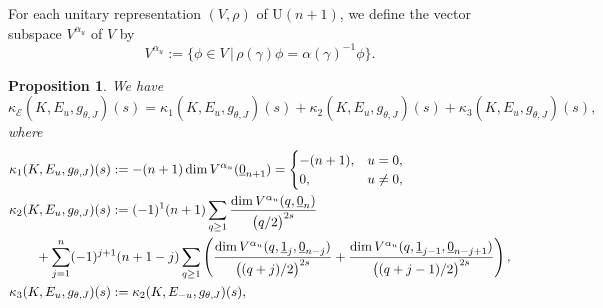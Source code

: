 \documentclass[10pt,a4paper]{amsart}
\numberwithin{equation}{section}
\newtheorem{Proposition}[Theorem]{Proposition}
 { \theoremstyle{definition}
\newtheorem{Definition}[Theorem]{Definition}
\newtheorem{Note}[Theorem]{Note}
\newtheorem{Example}[Theorem]{Example}
\newtheorem{Remark}[Theorem]{Remark} }
\newcommand{\RN}{\cE}
\newcommand{\cE}{\mathcal{E}}
\begin{document}
For each unitary representation $(V , \rho )$ of $\mathrm{U}(n+1)$, we define the vector subspace $V^{\alpha_u}$ of $V$ by
\[
V^{\alpha_u} := \big\{ \phi \in V \, \big| \, \rho ( \gamma ) \phi = \alpha ( \gamma )^{-1} \phi \big\}
.
\]

\begin{Proposition}
 We have
 \begin{equation} \label{eq:decom_of_kappa}
 \kappa_\RN (K, E_{u} , g_{\theta , J} ) (s)
 =
 \kappa_{1} (K, E_{u} , g_{\theta , J} ) (s)
 + \kappa_{2} (K, E_{u} , g_{\theta , J} ) (s)
 + \kappa_{3} (K, E_{u} , g_{\theta , J} ) (s),
 \end{equation}
 where
 \begin{align}
 & \kappa_{1} (K, E_{u} , g_{\theta , J} ) (s)
 := -(n+1 ) \dim V^{\alpha_u} ( \underline{0}_{n+1} )
 = \begin{cases}
 -(n+1 ), & u = 0,
 \\
 0, & u \not = 0,
 \end{cases}
 \label{eq:def_of_kappa_1}
 \\
 & \kappa_{2} (K, E_{u} , g_{\theta , J} ) (s)
 :=
 (-1 )^{1} (n+1)
 \sum_{q \geq 1 }
 \frac{
 \dim V^{\alpha_u} ( q, \underline{0}_{n} )
 }{
 \bigl( q /2 \bigr)^{2s}
 }
 \notag
 \\
 & \qquad{}+
 \sum_{j=1}^{n}
 (-1 )^{j+1} (n+1-j)
 \sum_{q \geq 1 }
 \left(
 \frac{
 \dim V^{\alpha_u} ( q, \underline{1}_{j} ,\underline{0}_{n-j} )
 }{
 \bigl( ( q+j)/2 \bigr)^{2s}
 }
 +
 \frac{
 \dim V^{\alpha_u} ( q, \underline{1}_{j-1} ,\underline{0}_{n-j+1} )
 }{
 \bigl( (q+j-1)/2 \bigr)^{2s}
 }
 \right) ,\nonumber
\\
& \kappa_{3} (K, E_{u} , g_{\theta , J} ) (s)
 :=
 \kappa_{2} (K, E_{-u} , g_{\theta , J} ) (s)
 ,
 \label{eq:def_of_kappa_3}
 \end{align}
\end{Proposition}
\end{document}
